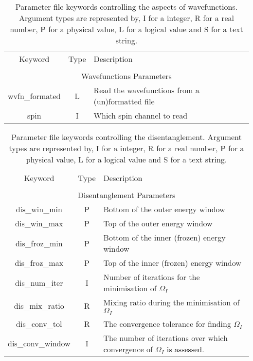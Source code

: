\begin{table}
\begin{center}
\begin{tabular}{|c|c|p{6cm}|}
\hline
Keyword & Type & Description \\
        &      &             \\
\hline\hline
\multicolumn{3}{|c|}{Wavefunctions Parameters} \\
\hline
{\sc wvfn\_formated }   & L & Read the wavefunctions from a  (un)formatted file  \\
{\sc spin }   & I & Which spin channel to read \\
\hline
\end{tabular}
\caption
{Parameter file keywords controlling the aspects of wavefunctions.  Argument types
are represented by, I for a integer, R for a real number, P for a
physical value, L for a logical value and S for a text string.}
\label{parameter_keywords2}
\end{center}
\end{table}



\begin{table}
\begin{center}
\begin{tabular}{|c|c|p{6cm}|}
\hline
Keyword & Type & Description \\
        &      &             \\
\hline\hline
\multicolumn{3}{|c|}{Disentanglement Parameters} \\
\hline
{\sc dis\_win\_min }   & P & Bottom of the outer energy window \\
{\sc dis\_win\_max }   & P & Top of the outer energy window \\
{\sc dis\_froz\_min }   & P & Bottom of the inner (frozen) energy window \\
{\sc dis\_froz\_max }   & P & Top of the inner (frozen) energy window \\
{\sc dis\_num\_iter }   & I & Number of iterations for the minimisation
of $\Omega_{I}$ \\
{\sc dis\_mix\_ratio }   & R & Mixing ratio during the minimisation of $\Omega_{I}$\\
{\sc dis\_conv\_tol }   & R & The convergence tolerance for finding $\Omega_{I}$ \\
{\sc dis\_conv\_window }   & I & The number of iterations over which
convergence of $\Omega_{I}$ is assessed. \\ 
\hline
\end{tabular}
\caption[Parameter file keywords controlling disentanglement parameters.]
{Parameter file keywords controlling the disentanglement.  Argument types
are represented by, I for a integer, R for a real number, P for a
physical value, L for a logical value and S for a text string.}
\label{parameter_keywords4}
\end{center}
\end{table}




